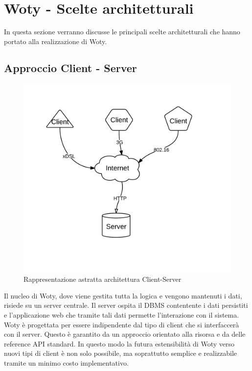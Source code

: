 {{\section{Woty - Scelte architetturali}
In questa sezione verranno discusse le principali scelte architetturali che hanno portato alla realizzazione di Woty. 

\subsection{Approccio Client - Server}

\begin{center}
\begin{figure}[ht]
\centering
\includegraphics[scale=0.55]{images/cap2/Client-server.png}
\caption{Rappresentazione astratta architettura Client-Server}
\end{figure}
\end{center}

Il nucleo di Woty, dove viene gestita tutta la logica e vengono mantenuti i dati, risiede su un server centrale. Il server ospita il DBMS contentente i dati persistiti e l'applicazione web che tramite tali dati permette l'interazione con il sistema.\\
Woty è progettata per essere indipendente dal tipo di client che si interfaccerà con il server. Questo è garantito da un approccio orientato alla risorsa e da delle reference API standard. In questo modo la futura estensibilità di Woty verso nuovi tipi di client è non solo possibile, ma soprattutto semplice e realizzabile tramite un minimo costo implementativo.\\


}}
